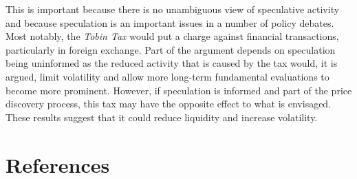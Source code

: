 \documentclass[preprint,12pt,authoryear]{elsarticle}
\begin{document}
This is important because there is no unambiguous view of speculative activity and because speculation is an important issues in a number of policy debates.  Most notably, the \emph{Tobin Tax} would put a charge against financial transactions, particularly in foreign exchange.  Part of the argument depends on speculation being uninformed as the reduced activity that is caused by the tax would, it is argued, limit volatility and allow more long-term fundamental evaluations to become more prominent.  However, if speculation is informed and part of the price discovery process, this tax may have the opposite effect to what is envisaged.  These results suggest that it could reduce liquidity and increase volatility. 

\section*{References}

\end{document}
